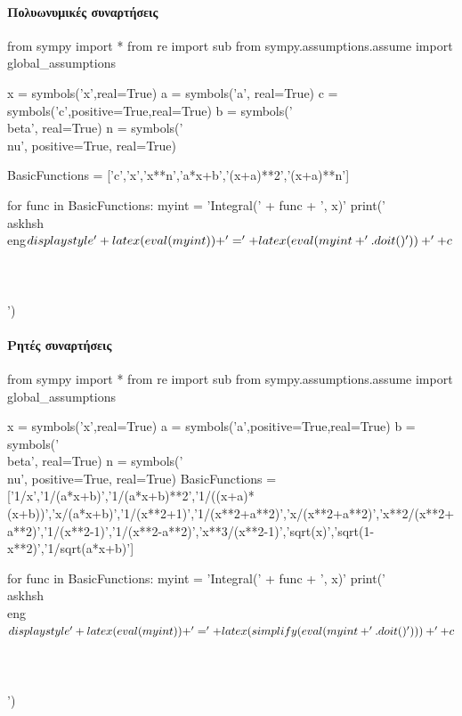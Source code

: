\documentclass[11pt,a3paper,twocolumn]{article}
\newcommand{\kerkissans}[1]{{\fontfamily{maksf}\selectfont \textbf{#1}}}
\newcounter{askhsh}
\newcommand{\askhsh}{{\large\theaskhsh.}\ \addtocounter{askhsh}{1}}
\newcommand{\eng}[1]{\selectlanguage{english}#1\selectlanguage{greek}}
\begin{document}
\twocolumn[{
\centering
\kerkissans{{\huge Ολοκληρώματα}\\\vspace{3mm} {\Large ΤΥΠΟΛΟΓΙΟ}}\vspace{5mm}}]
\paragraph{Πολυωνυμικές συναρτήσεις}
\begin{sympycode}
from sympy import *
from re import sub
from sympy.assumptions.assume import global_assumptions

x = symbols('x',real=True)
a = symbols('a', real=True)
c = symbols('c',positive=True,real=True)
b = symbols('\\beta', real=True)
n = symbols('\\nu', positive=True, real=True)

BasicFunctions = ['c','x','x**n','a*x+b','(x+a)**2','(x+a)**n']

for func in BasicFunctions:
	myint = 'Integral(' + func + ', x)'
	print('\\askhsh \\eng{$\\displaystyle'+latex(eval(myint)) + '=' +
	latex(eval(myint+'.doit()')) + '+c$}\\\\\\\\')
\end{sympycode}
\paragraph{Ρητές συναρτήσεις}
\begin{sympycode}
from sympy import *
from re import sub
from sympy.assumptions.assume import global_assumptions

x = symbols('x',real=True)
a = symbols('a',positive=True,real=True)
b = symbols('\\beta', real=True)
n = symbols('\\nu', positive=True, real=True)
BasicFunctions = ['1/x','1/(a*x+b)','1/(a*x+b)**2','1/((x+a)*(x+b))','x/(a*x+b)','1/(x**2+1)','1/(x**2+a**2)','x/(x**2+a**2)','x**2/(x**2+a**2)','1/(x**2-1)','1/(x**2-a**2)','x**3/(x**2-1)','sqrt(x)','sqrt(1-x**2)','1/sqrt(a*x+b)']

for func in BasicFunctions:
	myint = 'Integral(' + func + ', x)'
	print('\\askhsh \\eng{$\\displaystyle'+latex(eval(myint)) + '=' +
	latex(simplify(eval(myint+'.doit()'))) + '+c$}\\\\\\\\')
\end{sympycode}
\end{document}
